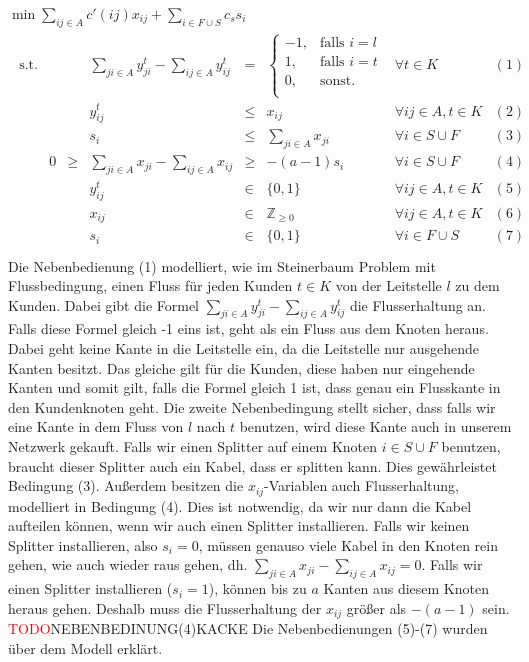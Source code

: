 \documentclass[11pt,a4paper]{article}
\newcommand{\Z}{\mathbb{Z}}
\newcommand{\TODO}{\textcolor{red}{TODO}}
\theoremstyle{my_th_style1}
\begin{document}
 \bigskip
 $\min \displaystyle\sum_{ij \in A} c'(ij) x_{ij} + \displaystyle\sum_{i \in F \cup S} c_s s_i $
 \begin{align*}
 \begin{array}{rcrcrcll}
 \textrm{s.t.}  
&& &\displaystyle\sum_{ji \in A} y_{ji}^t - \displaystyle\sum_{ij \in A} y_{ij}^t& = & \left\{\begin{array}{cl} 
 -1, & \text{falls } i=l\\ 
 1, & \text{falls } i=t\\ 
 0, & \text{sonst.}\\ 
 \end{array}
 \right. & \forall t \in K & (1) \\
 &&& y_{ij}^t & \leq & x_{ij} & \forall ij \in A, t\in K & (2)\\
 &&& s_i &\leq& \displaystyle\sum_{ji \in A} x_{ji}& \forall  i \in S \cup F& (3)\\ 
 &0&\geq&\displaystyle\sum_{ji \in A} x_{ji} - \displaystyle\sum_{ij \in A} x_{ij}&\geq& -(a-1)s_i & \forall i \in S \cup F& (4)\\
 &&& y_{ij}^t & \in & \{0,1 \}& \forall ij \in A, t \in K & (5)\\
 &&& x_{ij} & \in & \Z _{\geq 0}& \forall ij \in A, t \in K & (6)\\
 &&& s_i & \in & \{ 0,1 \} & \forall i \in F \cup S & (7) \\
 \end{array}
 \end{align*}
 Die Nebenbedienung (1) modelliert, wie im Steinerbaum Problem mit Flussbedingung, einen Fluss für jeden Kunden $t \in K$ von der Leitstelle $l$ zu dem Kunden. Dabei gibt die Formel $\displaystyle\sum_{ji \in A} y_{ji}^t - \displaystyle\sum_{ij \in A} y_{ij}^t$ die Flusserhaltung an. Falls diese Formel gleich -1 eins ist, geht als ein Fluss aus dem Knoten heraus. Dabei geht keine Kante in die Leitstelle ein, da die Leitstelle nur ausgehende Kanten besitzt. Das gleiche gilt für die Kunden, diese haben nur eingehende Kanten und somit gilt, falls die Formel gleich 1 ist, dass genau ein Flusskante in den Kundenknoten geht. Die zweite Nebenbedingung stellt sicher, dass falls wir eine Kante in dem Fluss von $l$ nach $t$ benutzen, wird diese Kante auch in unserem Netzwerk gekauft. Falls wir einen Splitter auf einem Knoten $i \in S \cup F$ benutzen, braucht dieser Splitter auch ein Kabel, dass er splitten kann. Dies gewährleistet Bedingung (3). Außerdem besitzen die $x_{ij}$-Variablen auch Flusserhaltung, modelliert in Bedingung (4). Dies ist notwendig, da wir nur dann die Kabel aufteilen können, wenn wir auch einen Splitter installieren. Falls wir keinen Splitter installieren, also $s_i=0$, müssen genauso viele Kabel in den Knoten rein gehen, wie auch wieder raus gehen, dh. $\displaystyle\sum_{ji \in A} x_{ji} - \displaystyle\sum_{ij \in A} x_{ij}=0$. Falls wir einen Splitter installieren ($s_i=1$), können bis zu $a$ Kanten aus diesem Knoten heraus gehen. Deshalb muss die Flusserhaltung der $x_{ij}$ größer als $-(a-1)$ sein. \TODO NEBENBEDINUNG(4)KACKE
 Die Nebenbedienungen (5)-(7) wurden über dem Modell erklärt.
  
\end{document}
